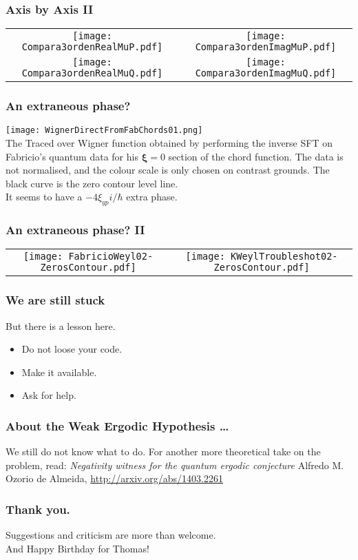 \documentclass{beamer}
\newcommand{\xifase}{ {\boldsymbol{\xi}} }
\begin{document}
\begin{frame}
  \frametitle{Axis by Axis II}
  \begin{tabular}{cc}
    \texttt{[image: Compara3ordenRealMuP.pdf]} &   
    \texttt{[image: Compara3ordenImagMuP.pdf]} \\
    \texttt{[image: Compara3ordenRealMuQ.pdf]} &
    \texttt{[image: Compara3ordenImagMuQ.pdf]}
 \end{tabular}    
\end{frame}



\begin{frame}
  \frametitle{An extraneous phase?}
  \centering     
    \texttt{[image: WignerDirectFromFabChords01.png]}\\
    The Traced over Wigner function obtained by performing the inverse
    SFT on Fabricio's quantum data for his $\xifase=0$ section of the chord function.
    The data is not normalised, and the colour scale is only chosen on contrast grounds.
    The black curve is the zero contour level line.  \\
    It seems to have a $-4\xi_{yp} i/\hbar$ extra phase.
\end{frame}


\begin{frame}
  \frametitle{An extraneous phase? II}
  \begin{tabular}{cc}
    \texttt{[image: FabricioWeyl02-ZerosContour.pdf]} &
    \texttt{[image: KWeylTroubleshot02-ZerosContour.pdf]}
  \end{tabular}
\end{frame}

\begin{frame}
  \frametitle{We are still stuck}
  But there is a lesson here. 
  \begin{itemize}
  \item Do not loose your code. 
  \item Make it available.
  \item Ask for help.
  \end{itemize}
\end{frame}


\begin{frame}
  \frametitle{About the Weak Ergodic Hypothesis \ldots}
  We still do not know what to do. For another more theoretical
  take on the problem, read:
  \emph{Negativity witness for the quantum ergodic conjecture}
  Alfredo M. Ozorio de Almeida, 
  \url{http://arxiv.org/abs/1403.2261}
\end{frame}


\begin{frame}
  \frametitle{Thank you.}
  Suggestions and criticism are more than welcome.\\
  And Happy Birthday for Thomas!
\end{frame}
\end{document}
